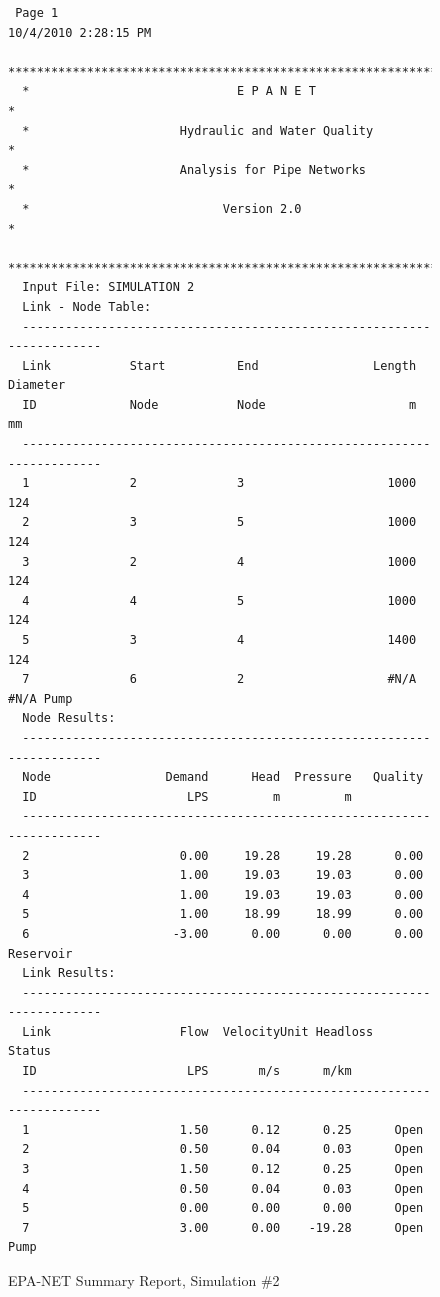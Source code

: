 \documentclass[11pt]{article}
\begin{document}
\begin{enumerate}
\begin{figure}[ht!] %
\centering
\begin{verbatim}
 Page 1                                            10/4/2010 2:28:15 PM
  **********************************************************************
  *                             E P A N E T                            *
  *                     Hydraulic and Water Quality                    *
  *                     Analysis for Pipe Networks                     *
  *                           Version 2.0                              *
  **********************************************************************
  Input File: SIMULATION 2
  Link - Node Table:
  ----------------------------------------------------------------------
  Link           Start          End                Length  Diameter
  ID             Node           Node                    m        mm
  ----------------------------------------------------------------------
  1              2              3                    1000       124
  2              3              5                    1000       124
  3              2              4                    1000       124
  4              4              5                    1000       124
  5              3              4                    1400       124
  7              6              2                    #N/A      #N/A Pump
  Node Results:
  ----------------------------------------------------------------------
  Node                Demand      Head  Pressure   Quality
  ID                     LPS         m         m          
  ----------------------------------------------------------------------
  2                     0.00     19.28     19.28      0.00
  3                     1.00     19.03     19.03      0.00
  4                     1.00     19.03     19.03      0.00
  5                     1.00     18.99     18.99      0.00
  6                    -3.00      0.00      0.00      0.00 Reservoir                                                              
  Link Results:
  ----------------------------------------------------------------------
  Link                  Flow  VelocityUnit Headloss    Status
  ID                     LPS       m/s      m/km
  ----------------------------------------------------------------------
  1                     1.50      0.12      0.25      Open
  2                     0.50      0.04      0.03      Open
  3                     1.50      0.12      0.25      Open
  4                     0.50      0.04      0.03      Open
  5                     0.00      0.00      0.00      Open
  7                     3.00      0.00    -19.28      Open Pump
  \end{verbatim}
     \caption{EPA-NET Summary Report, Simulation \#2}
   \label{fig:epanet2} 
\end{figure}


\end{enumerate}
\end{document}
